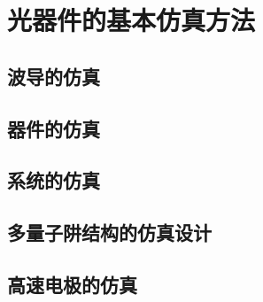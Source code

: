 \chapter{光器件的基本仿真方法}

\section{波导的仿真}

\section{器件的仿真}

\section{系统的仿真}

\section{多量子阱结构的仿真设计}

\section{高速电极的仿真}